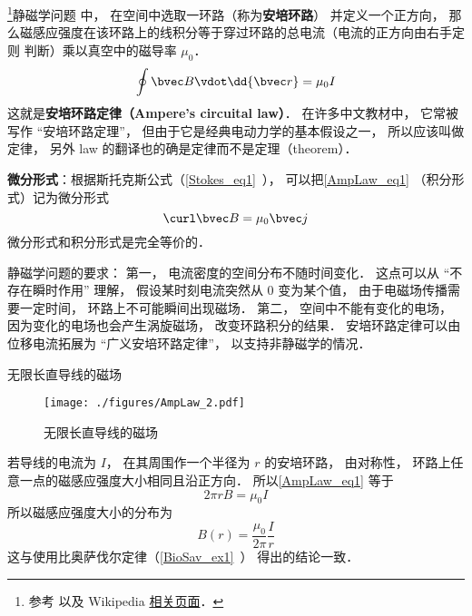 

\footnote{参考 \cite{GriffE} 以及 Wikipedia \href{https://en.wikipedia.org/wiki/Ampère's_circuital_law}{相关页面}．}静磁学问题%
中， 在空间中选取一环路（称为\textbf{安培环路}） 并定义一个正方向， 那么磁感应强度在该环路上的线积分等于穿过环路的总电流（电流的正方向由右手定则 判断）乘以真空中的磁导率 $\mu_0$．
\begin{equation}\label{AmpLaw_eq1}
\oint \bvec B \vdot \dd{\bvec r} = \mu_0 I
\end{equation}
这就是\textbf{安培环路定律（Ampere's circuital law）}． 在许多中文教材中， 它常被写作 “安培环路定理”， 但由于它是经典电动力学的基本假设之一， 所以应该叫做定律， 另外 law 的翻译也的确是定律而不是定理（theorem）．

\textbf{微分形式}：根据斯托克斯公式（\autoref{Stokes_eq1}~）， 可以把\autoref{AmpLaw_eq1} （积分形式）记为微分形式
\begin{equation}\label{AmpLaw_eq2}
\curl \bvec B = \mu_0 \bvec j
\end{equation}
微分形式和积分形式是完全等价的．

静磁学问题的要求： 第一， 电流密度的空间分布不随时间变化． 这点可以从 “不存在瞬时作用” 理解， 假设某时刻电流突然从 0 变为某个值， 由于电磁场传播需要一定时间， 环路上不可能瞬间出现磁场． 第二， 空间中不能有变化的电场， 因为变化的电场也会产生涡旋磁场， 改变环路积分的结果． 安培环路定律可以由位移电流拓展为 “广义安培环路定律”， 以支持非静磁学的情况．

\begin{example}{无限长直导线的磁场}\label{AmpLaw_ex1}
\begin{figure}[ht]
\centering
\texttt{[image: ./figures/AmpLaw\_2.pdf]}
\caption{无限长直导线的磁场} \label{AmpLaw_fig2}
\end{figure}
若导线的电流为 $I$， 在其周围作一个半径为 $r$ 的安培环路， 由对称性， 环路上任意一点的磁感应强度大小相同且沿正方向． 所以\autoref{AmpLaw_eq1} 等于
\begin{equation}
2\pi r B = \mu_0 I
\end{equation}
所以磁感应强度大小的分布为
\begin{equation}
B(r) = \frac{\mu_0}{2\pi} \frac Ir
\end{equation}
这与使用比奥萨伐尔定律（\autoref{BioSav_ex1}~） 得出的结论一致．
\end{example}

